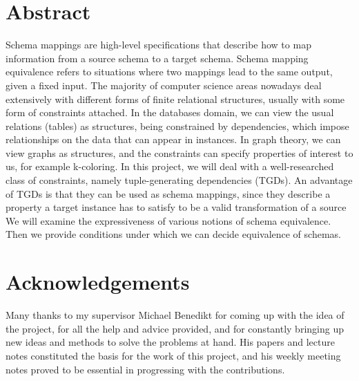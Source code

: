 \documentclass[11pt, a4paper, dvipsnames]{article}
\begin{document}
\section{Abstract}
Schema mappings are high-level specifications that describe how to map information from a source schema to a target schema. Schema mapping equivalence refers to situations where two mappings lead to the same output, given a fixed input. 
The majority of computer science areas nowadays deal extensively with different forms of finite relational structures, usually with some form of constraints attached. In the databases domain, we can view the usual relations (tables) as structures, being constrained by dependencies, which impose relationships on the data that can appear in instances. In graph theory, we can view graphs as structures, and the constraints can specify properties of interest to us, for example k-coloring. 
In this project,
we will deal with  a well-researched class of constraints, namely tuple-generating dependencies (TGDs).
An advantage of TGDs is that they can be used as schema mappings, since they describe a property a target instance
has to satisfy to be a valid transformation of a source
We will examine the expressiveness of various notions of schema equivalence. Then we provide conditions
under which we can decide equivalence of schemas.

\section{Acknowledgements}
Many thanks to my supervisor Michael Benedikt for coming up with the idea of the project, for all the help and advice provided, and for constantly bringing up new ideas and methods to solve the problems at hand. His papers and lecture notes constituted the basis for the work of this project, and his weekly meeting notes proved to be essential in progressing with the contributions.
\end{document}
